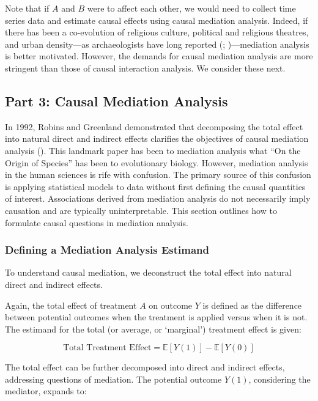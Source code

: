 \documentclass[
  single column]{article}
\begin{document}
Note that if \(A\) and \(B\) were to affect each other, we would need to
collect time series data and estimate causal effects using causal
mediation analysis. Indeed, if there has been a co-evolution of
religious culture, political and religious theatres, and urban
density---as archaeologists have long reported
(;
)---mediation analysis is
better motivated. However, the demands for causal mediation analysis are
more stringent than those of causal interaction analysis. We consider
these next.

\subsection{Part 3: Causal Mediation Analysis}\label{id-sec-3}

In 1992, Robins and Greenland demonstrated that decomposing the total
effect into natural direct and indirect effects clarifies the objectives
of causal mediation analysis (). This landmark paper has been to mediation analysis
what ``On the Origin of Species'' has been to evolutionary biology.
However, mediation analysis in the human sciences is rife with
confusion. The primary source of this confusion is applying statistical
models to data without first defining the causal quantities of interest.
Associations derived from mediation analysis do not necessarily imply
causation and are typically uninterpretable. This section outlines how
to formulate causal questions in mediation analysis.

\subsubsection{Defining a Mediation Analysis
Estimand}\label{defining-a-mediation-analysis-estimand}

To understand causal mediation, we deconstruct the total effect into
natural direct and indirect effects.

Again, the total effect of treatment \(A\) on outcome \(Y\) is defined
as the difference between potential outcomes when the treatment is
applied versus when it is not. The estimand for the total (or average,
or `marginal') treatment effect is given:

\[
\text{Total Treatment Effect} = \mathbb{E}[Y(1)] - \mathbb{E}[Y(0)]
\]

The total effect can be further decomposed into direct and indirect
effects, addressing questions of mediation. The potential outcome
\(Y(1)\), considering the mediator, expands to:
\end{document}
